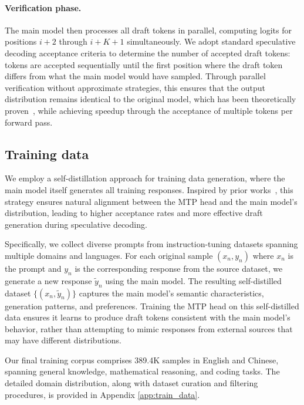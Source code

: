 \documentclass{article} %
\begin{document}
\paragraph{Verification phase.} The main model then processes all draft tokens in parallel, computing logits for positions $i+2$ through $i+K+1$ simultaneously. We adopt standard speculative decoding acceptance criteria to determine the number of accepted draft tokens: tokens are accepted sequentially until the first position where the draft token differs from what the main model would have sampled. Through parallel verification without approximate strategies, this ensures that the output distribution remains identical to the original model, which has been theoretically proven~\citep{leviathan2023fast,chen2023accelerating}, while achieving speedup through the acceptance of multiple tokens per forward pass.


\subsection{Training data}

We employ a self-distillation approach for training data generation, where the main model itself generates all training responses. Inspired by prior works~\citep{yang2024selfdistillation,cai2024medusa}, this strategy ensures natural alignment between the MTP head and the main model's distribution, leading to higher acceptance rates and more effective draft generation during speculative decoding.

Specifically, we collect diverse prompts from instruction-tuning datasets spanning multiple domains and languages. For each original sample $(x_n, y_n)$ where $x_n$ is the prompt and $y_n$ is the corresponding response from the source dataset, we generate a new response $\tilde{y}_n$ using the main model. The resulting self-distilled dataset $\{(x_n, \tilde{y}_n)\}$ captures the main model's semantic characteristics, generation patterns, and preferences. Training the MTP head on this self-distilled data ensures it learns to produce draft tokens consistent with the main model's behavior, rather than attempting to mimic responses from external sources that may have different distributions.

Our final training corpus comprises 389.4K samples in English and Chinese, spanning general knowledge, mathematical reasoning, and coding tasks. The detailed domain distribution, along with dataset curation and filtering procedures, is provided in Appendix \ref{app:train_data}.
\end{document}
